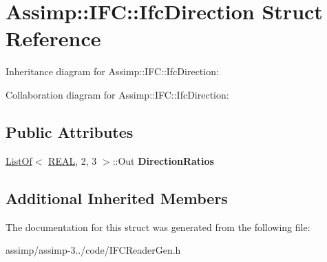 \hypertarget{struct_assimp_1_1_i_f_c_1_1_ifc_direction}{\section{Assimp\+:\+:I\+F\+C\+:\+:Ifc\+Direction Struct Reference}
\label{struct_assimp_1_1_i_f_c_1_1_ifc_direction}
}


Inheritance diagram for Assimp\+:\+:I\+F\+C\+:\+:Ifc\+Direction\+:


Collaboration diagram for Assimp\+:\+:I\+F\+C\+:\+:Ifc\+Direction\+:
\subsection*{Public Attributes}
\begin{DoxyCompactItemize}
\item 
\hypertarget{struct_assimp_1_1_i_f_c_1_1_ifc_direction_a836f8ed32ab335242ac227788c4a0928}{\hyperlink{struct_assimp_1_1_s_t_e_p_1_1_list_of}{List\+Of}$<$ \hyperlink{class_assimp_1_1_s_t_e_p_1_1_e_x_p_r_e_s_s_1_1_primitive_data_type}{R\+E\+A\+L}, 2, 3 $>$\+::Out {\bfseries Direction\+Ratios}}\label{struct_assimp_1_1_i_f_c_1_1_ifc_direction_a836f8ed32ab335242ac227788c4a0928}

\end{DoxyCompactItemize}
\subsection*{Additional Inherited Members}


The documentation for this struct was generated from the following file\+:\begin{DoxyCompactItemize}
\item 
assimp/assimp-\/3../code/I\+F\+C\+Reader\+Gen.\+h\end{DoxyCompactItemize}
